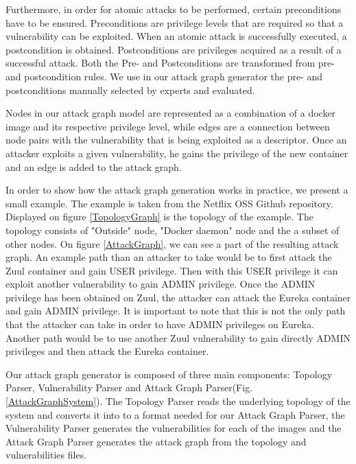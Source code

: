 \documentclass[letterpaper, 10 pt, conference]{ieeeconf}  %
\begin{document}
Furthermore, in order for atomic attacks to be performed, certain preconditions have to be ensured. Preconditions are privilege levels that are required so that a vulnerability can be exploited. When an atomic attack is successfully executed, a postcondition is obtained. Postconditions are privileges acquired as a result of a successful attack. Both the Pre- and Postconditions are transformed from pre- and postcondition rules. We use in our attack graph generator the pre- and postconditions manually selected by experts and evaluated.\cite{aksu}

Nodes in our attack graph model are represented as a combination of a docker image and its respective privilege level, while edges are a connection between node pairs with the vulnerability that is being exploited as a descriptor. Once an attacker exploits a given vulnerability, he gains the privilege of the new container and an edge is added to the attack graph.

In order to show how the attack graph generation works in practice, we present a small example. The example is taken from the Netflix OSS Github repository.\cite{netflixoss} Displayed on figure \ref{TopologyGraph} is the topology of the example. The topology consists of "Outside" node, "Docker daemon" node and the a subset of other nodes. On figure \ref{AttackGraph}, we can see a part of the resulting attack graph. An example path than an attacker to take would be to first attack the Zuul container and gain USER privilege. Then with this USER privilege it can exploit another vulnerability to gain ADMIN privilege. Once the ADMIN privilege has been obtained on Zuul, the attacker can attack the Eureka container and gain ADMIN privilege. It is important to note that this is not the only path that the attacker can take in order to have ADMIN privileges on Eureka. Another path would be to use another Zuul vulnerability to gain directly ADMIN privileges and then attack the Eureka container.

Our attack graph generator is composed of three main components: Topology Parser, Vulnerability Parser and Attack Graph Parser(Fig. \ref{AttackGraphSystem}). The Topology Parser reads the underlying topology of the system and converts it into to a format needed for our Attack Graph Parser, the Vulnerability Parser generates the vulnerabilities for each of the images and the Attack Graph Parser generates the attack graph from the topology and vulnerabilities files. 
\end{document}
